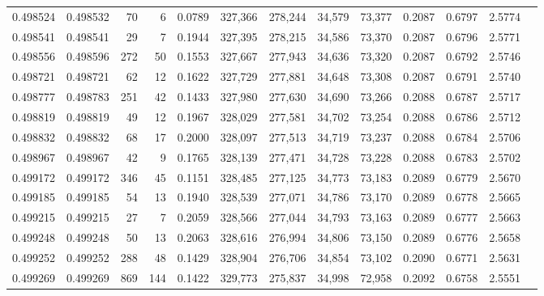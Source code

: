 \begin{tabular}{rrrrrrrrrrrrr}
0.498524 & 0.498532 &    70 &     6 &                                     0.0789 & 327,366 & 278,244 &  34,579 &  73,377 & 0.2087 & 0.6797 & 2.5774 \\
0.498541 & 0.498541 &    29 &     7 &                                     0.1944 & 327,395 & 278,215 &  34,586 &  73,370 & 0.2087 & 0.6796 & 2.5771 \\
0.498556 & 0.498596 &   272 &    50 &                                     0.1553 & 327,667 & 277,943 &  34,636 &  73,320 & 0.2087 & 0.6792 & 2.5746 \\
0.498721 & 0.498721 &    62 &    12 &                                     0.1622 & 327,729 & 277,881 &  34,648 &  73,308 & 0.2087 & 0.6791 & 2.5740 \\
0.498777 & 0.498783 &   251 &    42 &                                     0.1433 & 327,980 & 277,630 &  34,690 &  73,266 & 0.2088 & 0.6787 & 2.5717 \\
0.498819 & 0.498819 &    49 &    12 &                                     0.1967 & 328,029 & 277,581 &  34,702 &  73,254 & 0.2088 & 0.6786 & 2.5712 \\
0.498832 & 0.498832 &    68 &    17 &                                     0.2000 & 328,097 & 277,513 &  34,719 &  73,237 & 0.2088 & 0.6784 & 2.5706 \\
0.498967 & 0.498967 &    42 &     9 &                                     0.1765 & 328,139 & 277,471 &  34,728 &  73,228 & 0.2088 & 0.6783 & 2.5702 \\
0.499172 & 0.499172 &   346 &    45 &                                     0.1151 & 328,485 & 277,125 &  34,773 &  73,183 & 0.2089 & 0.6779 & 2.5670 \\
0.499185 & 0.499185 &    54 &    13 &                                     0.1940 & 328,539 & 277,071 &  34,786 &  73,170 & 0.2089 & 0.6778 & 2.5665 \\
0.499215 & 0.499215 &    27 &     7 &                                     0.2059 & 328,566 & 277,044 &  34,793 &  73,163 & 0.2089 & 0.6777 & 2.5663 \\
0.499248 & 0.499248 &    50 &    13 &                                     0.2063 & 328,616 & 276,994 &  34,806 &  73,150 & 0.2089 & 0.6776 & 2.5658 \\
0.499252 & 0.499252 &   288 &    48 &                                     0.1429 & 328,904 & 276,706 &  34,854 &  73,102 & 0.2090 & 0.6771 & 2.5631 \\
0.499269 & 0.499269 &   869 &   144 &                                     0.1422 & 329,773 & 275,837 &  34,998 &  72,958 & 0.2092 & 0.6758 & 2.5551 \\

\end{tabular}
